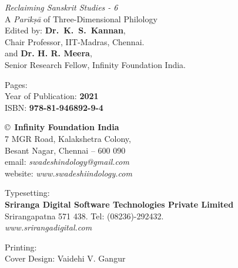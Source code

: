 \thispagestyle{empty}

\noindent
{\fontsize{9}{11}\selectfont\sl Reclaiming Sanskrit Studies - 6}\\
A \textit{Parīkṣā} of Three-Dimensional Philology\\
Edited by: {\bf Dr.\ K.~S.~Kannan},\\
Chair Professor, IIT-Madras, Chennai.\\
and {\bf Dr. H. R. Meera},\\
Senior Research Fellow, Infinity Foundation India.\\
\vfill

\noindent
Pages: {\bf\pageref{bookend}}\\
Year of Publication: {\bf 2021}\\
ISBN: {\bf 978-81-946892-9-4}\\

\vfill

\noindent
\copyright\ {\bf Infinity Foundation India}\\ 
7 MGR Road, Kalakshetra Colony,\\ 
Besant Nagar, Chennai -- 600 090\\
email: {\sl swadeshindology@gmail.com}\\
website: {\sl www.swadeshiindology.com} 
\vfill

\noindent
Typesetting:\\ 
{\bf Sriranga Digital Software Technologies Private Limited}\\ 
Srirangapatna 571 438. Tel: (08236)-292432.\\
{\sl www.srirangadigital.com}
\vfill

\noindent
Printing:\\

\noindent
Cover Design: Vaidehi V. Gangur\\ 
